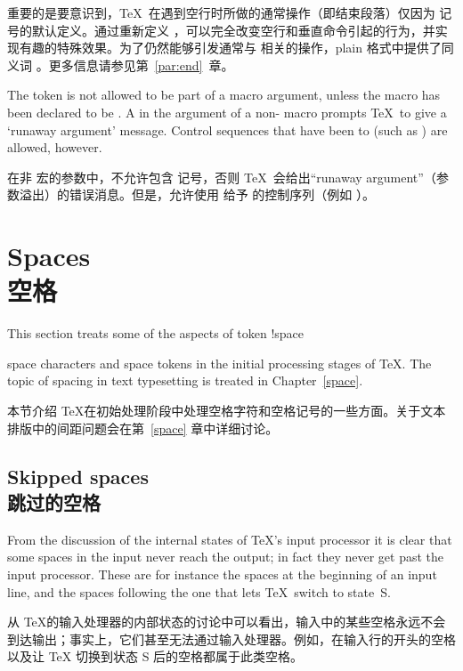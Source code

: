 重要的是要意识到，\TeX\ 在遇到空行时所做的通常操作（即结束段落）仅因为  记号的默认定义。通过重新定义 ，可以完全改变空行和垂直命令引起的行为，并实现有趣的特殊效果。为了仍然能够引发通常与  相关的操作，plain 格式中提供了同义词 。更多信息请参见第~\ref{par:end}~章。

The  token is not allowed to be part of a macro
argument, unless the macro has been declared to be .
A  in the argument of a non- macro
prompts \TeX\ to give a `runaway argument' message.
Control sequences that have been  to 
(such as ) are allowed, however.

在非  宏的参数中，不允许包含  记号，否则 \TeX\ 会给出“runaway argument”（参数溢出）的错误消息。但是，允许使用  给予  的控制序列（例如 ）。
 


\section{Spaces\\空格}

This section treats some of the aspects of
\term token !space\par
space characters and space tokens in the initial processing
stages of \TeX. The topic of spacing in text typesetting
is treated in Chapter~\ref{space}.

本节介绍 \TeX 在初始处理阶段中处理空格字符和空格记号的一些方面。关于文本排版中的间距问题会在第~\ref{space} 章中详细讨论。
\subsection{Skipped spaces\\跳过的空格}

From the discussion of the internal states of \TeX's 
input processor
it is clear that some spaces in the input never reach the
\awp
output; in fact they never get past the input processor.
These are for instance the spaces at the beginning
of an input line, and the spaces following the one
that lets \TeX\ switch to state~{\italic S}.

从 \TeX 的输入处理器的内部状态的讨论中可以看出，输入中的某些空格永远不会到达输出；事实上，它们甚至无法通过输入处理器。例如，在输入行的开头的空格以及让 \TeX{} 切换到状态 {\italic S} 后的空格都属于此类空格。


